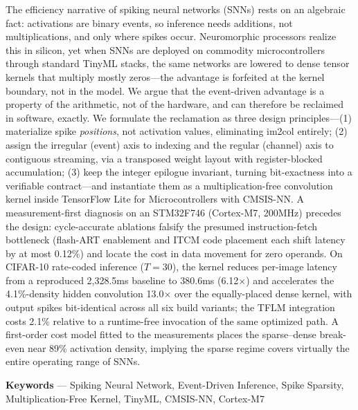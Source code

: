 The efficiency narrative of spiking neural networks (SNNs) rests on an algebraic fact: activations are binary events, so inference needs additions, not multiplications, and only where spikes occur. Neuromorphic processors realize this in silicon, yet when SNNs are deployed on commodity microcontrollers through standard TinyML stacks, the same networks are lowered to dense tensor kernels that multiply mostly zeros---the advantage is forfeited at the kernel boundary, not in the model. We argue that the event-driven advantage is a property of the arithmetic, not of the hardware, and can therefore be reclaimed in software, exactly. We formulate the reclamation as three design principles---(1) materialize spike \emph{positions}, not activation values, eliminating im2col entirely; (2) assign the irregular (event) axis to indexing and the regular (channel) axis to contiguous streaming, via a transposed weight layout with register-blocked accumulation; (3) keep the integer epilogue invariant, turning bit-exactness into a verifiable contract---and instantiate them as a multiplication-free convolution kernel inside TensorFlow Lite for Microcontrollers with CMSIS-NN. A measurement-first diagnosis on an STM32F746 (Cortex-M7, 200MHz) precedes the design: cycle-accurate ablations falsify the presumed instruction-fetch bottleneck (flash-ART enablement and ITCM code placement each shift latency by at most 0.12\%) and locate the cost in data movement for zero operands. On CIFAR-10 rate-coded inference ($T{=}30$), the kernel reduces per-image latency from a reproduced 2,328.5ms baseline to 380.6ms (6.12$\times$) and accelerates the 4.1\%-density hidden convolution 13.0$\times$ over the equally-placed dense kernel, with output spikes bit-identical across all six build variants; the TFLM integration costs 2.1\% relative to a runtime-free invocation of the same optimized path. A first-order cost model fitted to the measurements places the sparse--dense break-even near 89\% activation density, implying the sparse regime covers virtually the entire operating range of SNNs.
\par\vspace{0.5\baselineskip}\noindent
\textbf{Keywords} --- Spiking Neural Network, Event-Driven Inference, Spike Sparsity, Multiplication-Free Kernel, TinyML, CMSIS-NN, Cortex-M7
